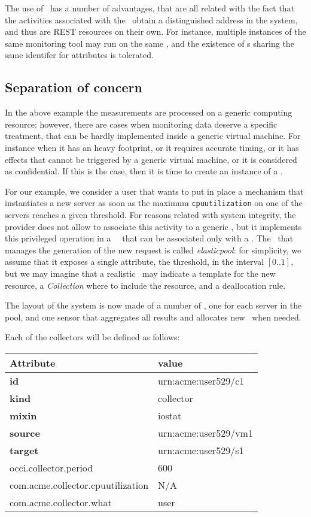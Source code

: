 \documentclass[12pt]{article}  %
\begin{document}
The use of \coll\ has a number of advantages, that are all related with the fact that the activities associated with the \mi\ obtain a distinguished address in the system, and thus are REST resources on their own. For instance, multiple instances of the same monitoring tool may run on the same \rs , and the existence of \mi s sharing the same identifer for attributes is tolerated.

\subsection*{Separation of concern}

In the above example the measurements are processed on a generic computing resource: however, there are cases when monitoring data deserve a specific treatment, that can be hardly implemented inside a generic virtual machine. For instance when it has an heavy footprint, or it requires accurate timing, or it has effects that cannot be triggered by a generic virtual machine, or it is considered as confidential. If this is the case, then it is time to create an instance of a \sens .

For our example, we consider a user that wants to put in place a mechanism that instantiates a new server as soon as the maximum {\tt \small cpuutilization} on one of the servers reaches a given threshold. For reasons related with system integrity, the provider does not allow to associate this activity to a generic \rs , but it implements this privileged operation in a \publ\ \mi\ that can be associated only with a \sens . The \mi\ that manages the generation of the new request is called {\em elasticpool}: for simplicity, we assume that it exposes a single attribute, the threshold, in the interval $[0..1]$, but we may imagine that a realistic \mi\ may indicate a template for the new resource, a {\em Collection} where to include the resource, and a deallocation rule.

The layout of the system is now made of a number of \coll , one for each server in the pool, and one sensor that aggregates all results and allocates new \comp\ when needed.

Each of the collectors will be defined as follows:

{
\small
\begin{tabular}{l|l}
Attribute                         & value \\ \hline
{\bf id}                          & urn:acme:user529/c1 \\
{\bf kind}                        & collector \\
{\bf mixin}                       & iostat    \\
{\bf source}                      & urn:acme:user529/vm1 \\
{\bf target}                      & urn:acme:user529/s1  \\
occi.collector.period             & 600   \\
com.acme.collector.cpuutilization & N/A   \\                     
com.acme.collector.what           & user  \\
\end{tabular}
}
\end{document}
